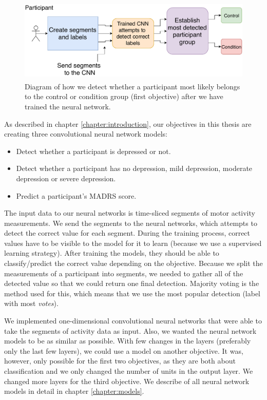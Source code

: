 \begin{figure}[h]
  \begin{center}
      \includegraphics[height=4cm]{img/flow_detection.pdf}
      \caption{Diagram of how we detect whether a participant most likely belongs to the control or condition group (first objective) after we have trained the neural network. }
      \label{figure:flow}
  \end{center}
\end{figure}

As described in chapter \ref{chapter:introduction}, our objectives in this thesis are creating three convolutional neural network models:

\begin{itemize}
  \item Detect whether a participant is depressed or not.
  \item Detect whether a participant has no depression, mild depression, moderate depression or severe depression.
  \item Predict a participant's MADRS score.
\end{itemize}

The input data to our neural networks is time-sliced segments of motor activity measurements. We send the segments to the neural networks, which attempts to detect the correct value for each segment. During the training process, correct values have to be visible to the model for it to learn (because we use a supervised learning strategy). After training the models, they should be able to classify/predict the correct value depending on the objective. Because we split the measurements of a participant into segments, we needed to gather all of the detected value so that we could return one final detection. Majority voting is the method used for this, which means that we use the most popular detection (label with most \textit{votes}). 

We implemented one-dimensional convolutional neural networks that were able to take the segments of activity data as input. Also, we wanted the neural network models to be as similar as possible. With few changes in the layers (preferably only the last few layers), we could use a model on another objective. It was, however, only possible for the first two objectives, as they are both about classification and we only changed the number of units in the output layer. We changed more layers for the third objective. We describe of all neural network models in detail in chapter \ref{chapter:models}.

